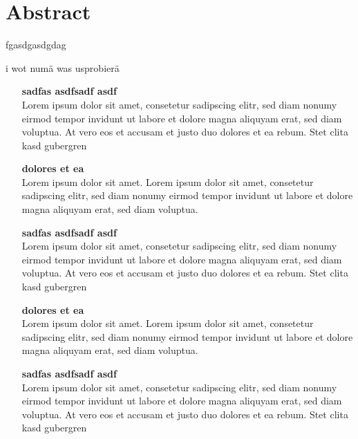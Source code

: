 \chapter*{Abstract}
\thispagestyle{empty}
fgasdgasdgdag

i wot numä was usprobierä
\begin{itemize}

\item[\textsf{\textbf{\large sadfas asdfsadf asdf}}] \quad \\
Lorem ipsum dolor sit amet, consetetur sadipscing elitr, sed diam nonumy eirmod tempor invidunt ut labore et dolore magna aliquyam erat, sed diam voluptua. At vero eos et accusam et justo duo dolores et ea rebum. Stet clita kasd gubergren

\item[\textsf{\textbf{\large dolores et ea}}] \quad \\
Lorem ipsum dolor sit amet. Lorem ipsum dolor sit amet, consetetur sadipscing elitr, sed diam nonumy eirmod tempor invidunt ut labore et dolore magna aliquyam erat, sed diam voluptua.

\item[\textsf{\textbf{\large sadfas asdfsadf asdf}}] \quad \\
Lorem ipsum dolor sit amet, consetetur sadipscing elitr, sed diam nonumy eirmod tempor invidunt ut labore et dolore magna aliquyam erat, sed diam voluptua. At vero eos et accusam et justo duo dolores et ea rebum. Stet clita kasd gubergren

\item[\textsf{\textbf{\large dolores et ea}}] \quad \\
Lorem ipsum dolor sit amet. Lorem ipsum dolor sit amet, consetetur sadipscing elitr, sed diam nonumy eirmod tempor invidunt ut labore et dolore magna aliquyam erat, sed diam voluptua.

\item[\textsf{\textbf{\large sadfas asdfsadf asdf}}] \quad \\
Lorem ipsum dolor sit amet, consetetur sadipscing elitr, sed diam nonumy eirmod tempor invidunt ut labore et dolore magna aliquyam erat, sed diam voluptua. At vero eos et accusam et justo duo dolores et ea rebum. Stet clita kasd gubergren

\end{itemize}


\newpage                
\thispagestyle{empty}
\mbox{}